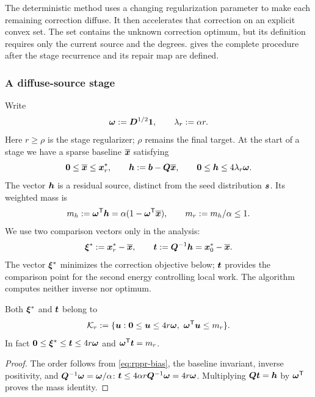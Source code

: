 The deterministic method uses a changing regularization parameter to make
each remaining correction diffuse. It then accelerates that correction on
an explicit convex set. The set contains the unknown correction optimum,
but its definition requires only the current source and the degrees.
 gives the complete procedure after the stage
recurrence and its repair map are defined.

\subsubsection{A diffuse-source stage}

Write
\begin{equation*}
 \bm{\omega}:=\bm{D}^{1/2}\mathbf{1},
 \qquad \lambda_r:=\alpha r.
\end{equation*}
Here $r\geq\rho$ is the stage regularizer; $\rho$ remains the final target.
At the start of a stage we have a sparse baseline $\overline{\bm{x}}$ satisfying
\begin{equation*}
 \bm{0}\leq\overline{\bm{x}}\leq\bm{x}_r^*,\qquad
 \bm{h}:=\bm{b}-\bm{Q}\overline{\bm{x}},\qquad
 \bm{0}\leq\bm{h}\leq4\lambda_r\bm{\omega}.
\end{equation*}
The vector $\bm{h}$ is a residual source, distinct from the seed distribution
$\bm{s}$. Its weighted mass is
\begin{equation*}
 m_h:=\bm{\omega}^{\mathsf{T}}\bm{h}
      =\alpha(1-\bm{\omega}^{\mathsf{T}}\overline{\bm{x}}),\qquad
 m_r:=m_h/\alpha\leq1.
\end{equation*}
We use two comparison vectors only in the analysis:
\begin{equation*}
 \bm{\xi}^*:=\bm{x}_r^*-\overline{\bm{x}},
 \qquad \bm{t}:=\bm{Q}^{-1}\bm{h}=\bm{x}_0^*-\overline{\bm{x}}.
\end{equation*}
The vector $\bm{\xi}^*$ minimizes the correction objective below; $\bm{t}$
provides the comparison point for the second energy controlling local work.
The algorithm computes neither inverse nor optimum.

\begin{lemma}
\label{lem:det-correction-domain}
Both $\bm{\xi}^*$ and $\bm{t}$ belong to
\begin{equation*}
 \mathcal{K}_r:=\{\bm{u}:\bm{0}\leq\bm{u}\leq4r\bm{\omega},
                    \ \bm{\omega}^{\mathsf{T}}\bm{u}\leq m_r\}.
\end{equation*}
In fact $\bm{0}\leq\bm{\xi}^*\leq\bm{t}\leq4r\bm{\omega}$ and
$\bm{\omega}^{\mathsf{T}}\bm{t}=m_r$.
\end{lemma}
\begin{proof}
The order follows from \cref{eq:rppr-bias}, the baseline invariant,
inverse positivity, and
$\bm{Q}^{-1}\bm{\omega}=\bm{\omega}/\alpha$:
$\bm{t}\leq4\alpha r\bm{Q}^{-1}\bm{\omega}=4r\bm{\omega}$.
Multiplying $\bm{Q}\bm{t}=\bm{h}$ by $\bm{\omega}^{\mathsf{T}}$ proves the mass identity.
\end{proof}

